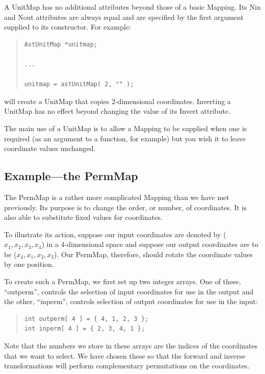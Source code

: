\documentclass[twoside,11pt]{article}
\newcommand{\htmlref}[2]{#1}
\begin{document}
A UnitMap has no additional attributes beyond those of a basic
Mapping. Its \htmlref{Nin}{Nin} and \htmlref{Nout}{Nout} attributes are always equal and are
specified by the first argument supplied to its constructor. For
example:

\begin{quote}
\small
\begin{verbatim}
AstUnitMap *unitmap;

...

unitmap = astUnitMap( 2, "" );
\end{verbatim}
\normalsize
\end{quote}

will create a UnitMap that copies 2-dimensional coordinates. Inverting
a UnitMap has no effect beyond changing the value of its \htmlref{Invert}{Invert}
attribute.

The main use of a UnitMap is to allow a Mapping to be supplied when one
is required (as an argument to a function, for example) but you wish
it to leave coordinate values unchanged.

\subsection{\label{ss:permmapexample}Example---the PermMap}

The \htmlref{PermMap}{PermMap} is a rather more complicated \htmlref{Mapping}{Mapping} than we have met
previously.  Its purpose is to change the order, or number, of
coordinates. It is also able to substitute fixed values for
coordinates.

To illustrate its action, suppose our input coordinates are denoted by
($x_1,x_2,x_3,x_4$) in a 4-dimensional space and suppose our output
coordinates are to be ($x_4,x_1,x_2,x_3$). Our PermMap, therefore,
should rotate the coordinate values by one position.

To create such a PermMap, we first set up two integer arrays. One of
these, ``outperm'', controls the selection of input coordinates for
use in the output and the other, ``inperm'', controls selection of
output coordinates for use in the input:

\begin{quote}
\small
\begin{verbatim}
int outperm[ 4 ] = { 4, 1, 2, 3 };
int inperm[ 4 ] = { 2, 3, 4, 1 };
\end{verbatim}
\normalsize
\end{quote}

Note that the numbers we store in these arrays are the indices of the
coordinates that we want to select. We have chosen these so that the
forward and inverse transformations will perform complementary
permutations on the coordinates.
\end{document}
